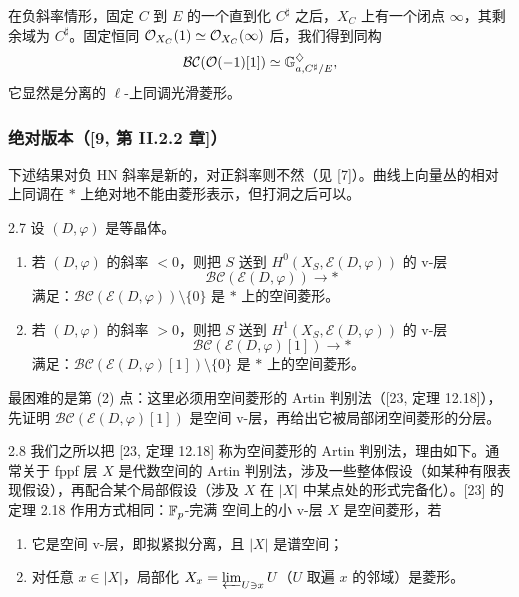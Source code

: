 在负斜率情形，固定 $C$ 到 $E$ 的一个直到化 $C^\sharp$ 之后，$X_C$ 上有一个闭点 $\infty$，其剩余域为 $C^\sharp$。固定恒同 $\mathcal{O}_{X_C}(1)\simeq\mathcal{O}_{X_C}(\infty)$ 后，我们得到同构
\[
\mathcal{BC}(\mathcal{O}(-1)[1])\simeq\mathbb G^{\diamondsuit}_{a,C^\sharp/E},
\]
它显然是分离的 $\ell$-上同调光滑菱形。

\subsubsection{绝对版本（[9, 第 II.2.2 章]）}

下述结果对负 HN 斜率是新的，对正斜率则不然（见 [7]）。曲线上向量丛的相对上同调在 $*$ 上绝对地不能由菱形表示，但打洞之后可以。

\begin{thm}{2.7}
设 $(D,\varphi)$ 是等晶体。
\begin{enumerate}[label=(\arabic*),leftmargin=2.2em,itemsep=0.2em]
\item 若 $(D,\varphi)$ 的斜率 $<0$，则把 $S$ 送到 $H^0(X_S,\mathcal E(D,\varphi))$ 的 v-层
\[
\mathcal{BC}(\mathcal E(D,\varphi))\longrightarrow *
\]
满足：$\mathcal{BC}(\mathcal E(D,\varphi))\setminus\{0\}$ 是 $*$ 上的空间菱形。
\item 若 $(D,\varphi)$ 的斜率 $>0$，则把 $S$ 送到 $H^1(X_S,\mathcal E(D,\varphi))$ 的 v-层
\[
\mathcal{BC}(\mathcal E(D,\varphi)[1])\longrightarrow *
\]
满足：$\mathcal{BC}(\mathcal E(D,\varphi)[1])\setminus\{0\}$ 是 $*$ 上的空间菱形。
\end{enumerate}
\label{thm:a3-2-7}
\end{thm}

最困难的是第 (2) 点：这里必须用空间菱形的 Artin 判别法（[23, 定理 12.18]），先证明 $\mathcal{BC}(\mathcal E(D,\varphi)[1])$ 是空间 v-层，再给出它被局部闭空间菱形的分层。

\begin{rem}{2.8}
我们之所以把 [23, 定理 12.18] 称为空间菱形的 Artin 判别法，理由如下。通常关于 fppf 层 $X$ 是代数空间的 Artin 判别法，涉及一些整体假设（如某种有限表现假设），再配合某个局部假设（涉及 $X$ 在 $|X|$ 中某点处的形式完备化）。[23] 的定理 2.18 作用方式相同：$\mathbb{F}_p$-完满 空间上的小 v-层 $X$ 是空间菱形，若
\begin{enumerate}[label=(\arabic*),leftmargin=2.2em,itemsep=0.1em]
\item 它是空间 v-层，即拟紧拟分离，且 $|X|$ 是谱空间；
\item 对任意 $x\in|X|$，局部化 $X_x=\varprojlim_{U\ni x}U$（$U$ 取遍 $x$ 的邻域）是菱形。
\end{enumerate}
\label{rem:a3-2-8}
\end{rem}

